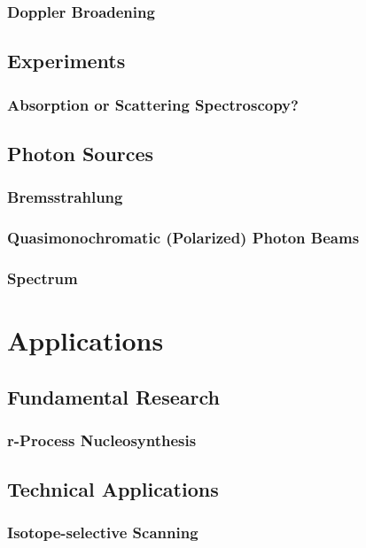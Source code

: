 \documentclass{beamer}
\begin{document}
\begin{frame}
    \frametitle{Doppler Broadening}
    
\end{frame}

\subsection{Experiments}

\begin{frame}
    \frametitle{Absorption or Scattering Spectroscopy?}
\end{frame}

\subsection{Photon Sources}

\begin{frame}
    \frametitle{Bremsstrahlung}
    
\end{frame}

\begin{frame}
    \frametitle{Quasimonochromatic (Polarized) Photon Beams}
    
\end{frame}

\begin{frame}
    \frametitle{Spectrum}
    
\end{frame}

\section{Applications}

\subsection{Fundamental Research}

\begin{frame}
    \frametitle{r-Process Nucleosynthesis}
      
\end{frame}

\subsection{Technical Applications}

\begin{frame}
    \frametitle{Isotope-selective Scanning}
    
\end{frame}
\end{document}
